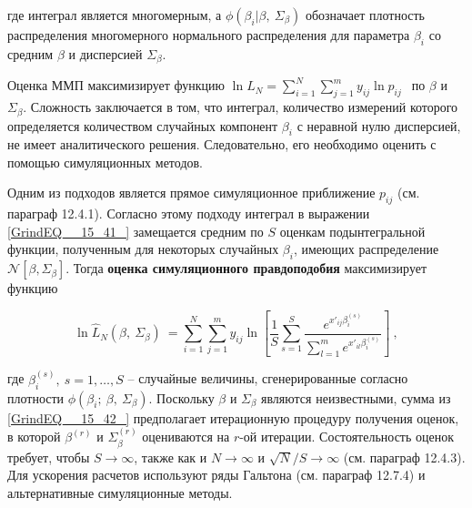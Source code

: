 где интеграл является многомерным, а $\phi({\beta }_i|\beta ,\ {\Sigma }_{\beta })$ обозначает плотность распределения многомерного нормального распределения для параметра ${\beta }_i$ со средним $\beta $ и дисперсией ${\Sigma }_{\beta }.$

Оценка ММП максимизирует функцию ${\ln  L_N=\sum^N_{i=1}{\sum^m_{j=1}{y_{ij}{\ln  p_{ij}\ }}}\ }$ по $\beta $ и ${\Sigma }_{\beta }.$ Сложность заключается в том, что интеграл, количество измерений которого определяется количеством случайных компонент ${\beta }_i$  с неравной нулю дисперсией, не имеет аналитического решения. Следовательно, его необходимо оценить с помощью симуляционных методов.

Одним из подходов является прямое симуляционное приближение $p_{ij}$  (см. параграф 12.4.1). Согласно этому подходу интеграл в выражении \eqref{GrindEQ__15_41_} замещается средним по $S$ оценкам подынтегральной функции, полученным для некоторых случайных ${\beta }_i$, имеющих распределение ${\mathcal N}[\beta , \Sigma_{\beta }]$. Тогда \textbf{оценка симуляционного  правдоподобия } максимизирует функцию

\begin{equation} \label{GrindEQ__15_42_} {\ln  {\hat{L}}_N(\beta ,\ {\Sigma }_{\beta })\ }=\sum^N_{i=1}{\sum^m_{j=1}{y_{ij}{\ln  \left[\frac{1}{S}\sum^S_{s=1}{\frac{e^{x'_{ij}{\beta }^{\left(s\right)}_i}}{\sum^m_{l=1}{e^{x'_{il}{\beta }^{\left(s\right)}_i}}}}\right]\ }}}, \end{equation} 

где ${\beta }^{\left(s\right)}_i,\ s=1,\dots ,S$ -- случайные величины, сгенерированные согласно  плотности $\phi\left({\beta }_i;\ \beta ,\ {\Sigma }_{\beta }\right).$ Поскольку $\beta $ и ${\Sigma }_{\beta }$ являются неизвестными, сумма из \eqref{GrindEQ__15_42_} предполагает итерационную процедуру получения оценок, в которой ${\beta }^{(r)}$ и ${\Sigma }^{(r)}_{\beta }$ оцениваются на $r$-ой итерации. Состоятельность оценок требует, чтобы  $S\to \infty $, также как и $N\to \infty $ и $\sqrt{N}/S\to \infty $ (см. параграф 12.4.3). Для ускорения расчетов  используют ряды Гальтона (см. параграф 12.7.4) и альтернативные симуляционные методы.


